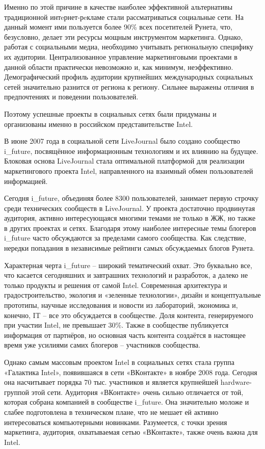 \documentclass[a4paper,english,russian]{G2-105}
\begin{document}
\par Именно по этой причине в качестве наиболее эффективной альтернативы традиционной интeрнет-рeкламе стали рассматриваться социальные сети. На данный момент ими пользуется более 90\% всех посетителей Рунета, что, безусловно, делает эти ресурсы мощным инструментом маркетинга. Однако, работая с социальными медиа, необходимо учитывать региональную специфику их аудитории. Централизованное управление маркетинговыми проектами в данной области практически невозможно и, как минимум, неэффективно. Демографический профиль аудитории крупнейших международных социальных сетей значительно разнится от региона к региону. Сильнее выражены отличия в предпочтениях и поведении пользователей.
\par Поэтому успешные проекты в социальных сетях были придуманы и организованы именно в российском представительстве Intel.
\par В июне 2007 года в социальной сети LiveJournal было создано сообщество i_future, посвящённое информационным технологиям и их влиянию на будущее. Блоковая основа LiveJournal стала оптимальной платформой для реализации маркетингового проекта Intel, направленного на взаимный обмен пользователей информацией.
\par Сегодня i_future, объединяя более 8300 пользователей, занимает первую строчку среди технических сообществ в LiveJournal. У проекта достаточно продвинутая аудитория, активно интересующаяся многими темами не только в ЖЖ, но также в других проектах и сетях. Благодаря этому наиболее интересные темы блогеров i_future часто обсуждаются за пределами самого сообщества. Как следствие, нередки попадания в независимые рейтинги самых обсуждаемых блогов Рунета.
\par Характерная черта i_future – широкий тематический охват. Это буквально все, что касается сегодняшних и завтрашних технологий и разработок, а далеко не только продукты и решения от самой Intel. Современная архитектура и градостроительство, экология и «зеленные технологии», дизайн и концептуальные прототипы, научные исследования и новости из лабораторий, экономика и, конечно, IT – все это обсуждается в сообществе. Доля контента, генерируемого при участии Intel, не превышает 30\%. Также в сообществе публикуется информация от партнёров, но основная часть контента создаётся в настоящее время уже усилиями самих блогеров – участников сообщества.
\par Однако самым массовым проектом Intel в социальных сетях стала группа «Галактика Intel», появившаяся в сети «ВКонтакте» в ноябре 2008 года. Сегодня она насчитывает порядка 70 тыс. участников и является крупнейшей hardware-группой этой сети. Аудитория «ВКонтакте» очень сильно отличается от той, которая собрана компанией в сообществе i_future. Она значительно моложе и слабее подготовлена в техническом плане, что не мешает ей активно интересоваться компьютерными новинками. Разумеется, с точки зрения маркетинга, аудитория, охватываемая сетью «ВКонтакте», также очень важна для Intel.
\end{document}
